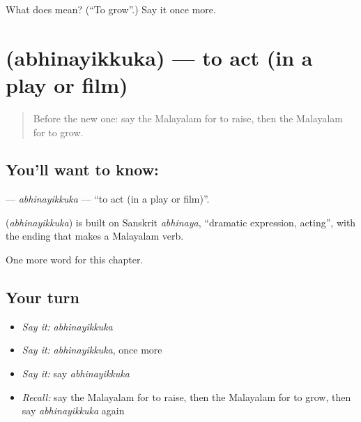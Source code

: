 \begin{tcolorbox}[breakable,colback=teal!4,colframe=teal!35!black,title={Before you move on}]
What does  mean? (\textquotedblleft{}To grow\textquotedblright{}.) Say it once more.
\end{tcolorbox}
\section[\texorpdfstring{\ml{അഭിനയിക്കുക} (abhinayikkuka)}{അഭിനയിക്കുക (abhinayikkuka)}]{ (abhinayikkuka) — to act (in a play or film)}

\label{lesson:ML-C307-abhinayikkuka}



\begin{quote}
Before the new one: say the Malayalam for to raise, then the Malayalam for to grow.
\end{quote}

\subsection*{You'll want to know: }
\textbf{} — \emph{abhinayikkuka} — \textquotedblleft{}to act (in a play or film)\textquotedblright{}.

\begin{cousinweb}
\textbf{} (\emph{abhinayikkuka}) is built on Sanskrit \emph{abhinaya}, \textquotedblleft{}dramatic expression, acting\textquotedblright{}, with the ending that makes a Malayalam verb.
\end{cousinweb}

\begin{grammarlens}[title={What you've built}]
One more word for this chapter.
\end{grammarlens}

\subsection*{Your turn}
\begin{itemize}
\raggedright
  \item \emph{Say it:} \emph{abhinayikkuka}
  \item \emph{Say it:} \emph{abhinayikkuka}, once more
  \item \emph{Say it:} say \emph{abhinayikkuka}
  \item \emph{Recall:} say the Malayalam for to raise, then the Malayalam for to grow, then say \emph{abhinayikkuka} again
\end{itemize}

